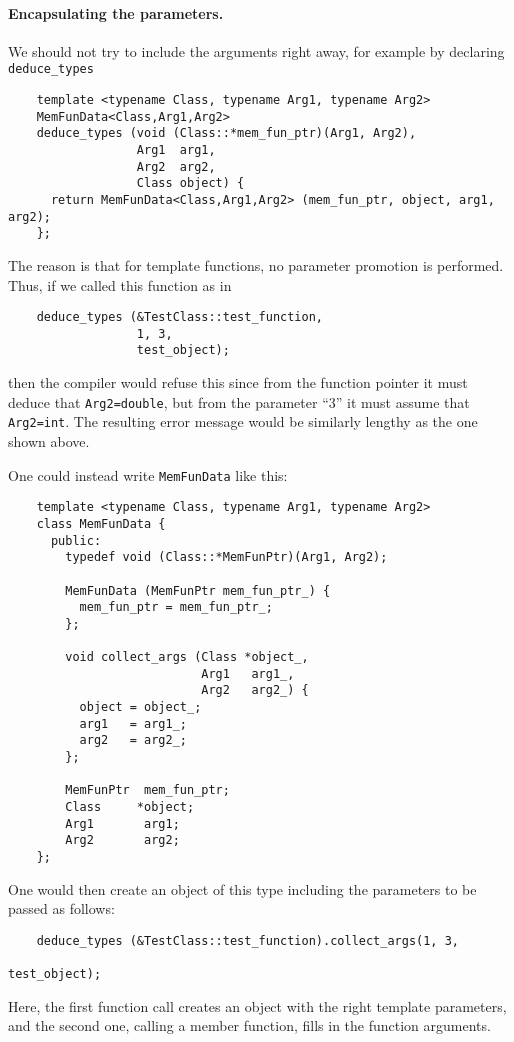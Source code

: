 \documentclass[11pt]{article}
\begin{document}
\paragraph{Encapsulating the parameters.}
We should
not try to include the arguments right away, for example by declaring
\texttt{deduce\_types}
\begin{verbatim}
    template <typename Class, typename Arg1, typename Arg2>
    MemFunData<Class,Arg1,Arg2>
    deduce_types (void (Class::*mem_fun_ptr)(Arg1, Arg2),
                  Arg1  arg1,
                  Arg2  arg2,
                  Class object) {
      return MemFunData<Class,Arg1,Arg2> (mem_fun_ptr, object, arg1, arg2);
    };
\end{verbatim}
The reason is that for template functions, no parameter promotion is
performed. Thus, if we called this function as in
\begin{verbatim}
    deduce_types (&TestClass::test_function,
                  1, 3,
                  test_object);
\end{verbatim}
then the compiler would refuse this since from the function pointer it must
deduce that \texttt{Arg2=double}, but from the parameter ``3'' it must assume
that \texttt{Arg2=int}. The resulting error message would be similarly lengthy
as the one shown above.

One could instead write \texttt{MemFunData} like this:
\begin{verbatim}
    template <typename Class, typename Arg1, typename Arg2>
    class MemFunData { 
      public:
        typedef void (Class::*MemFunPtr)(Arg1, Arg2);

        MemFunData (MemFunPtr mem_fun_ptr_) {
          mem_fun_ptr = mem_fun_ptr_;
        };

        void collect_args (Class *object_,
                           Arg1   arg1_,
                           Arg2   arg2_) {
          object = object_;
          arg1   = arg1_;
          arg2   = arg2_;
        };

        MemFunPtr  mem_fun_ptr;
        Class     *object;
        Arg1       arg1;
        Arg2       arg2;
    };
\end{verbatim}
One would then create an object of this type including the parameters to be
passed as follows:
\begin{verbatim}
    deduce_types (&TestClass::test_function).collect_args(1, 3,
                                                          test_object);
\end{verbatim}
Here, the first function call creates an object with the right template
parameters, and the second one, calling a member function, fills in the
function arguments. 
\end{document}
